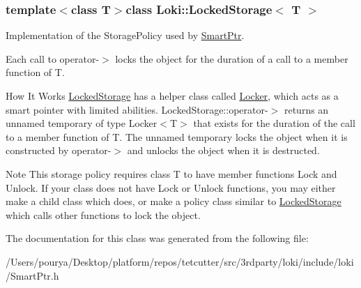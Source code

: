 \subsubsection*{template$<$class T$>$class Loki\+::\+Locked\+Storage$<$ T $>$}

Implementation of the Storage\+Policy used by \hyperlink{classLoki_1_1SmartPtr}{Smart\+Ptr}.

Each call to operator-\/$>$ locks the object for the duration of a call to a member function of T.

\begin{DoxyParagraph}{How It Works}
\hyperlink{classLoki_1_1LockedStorage}{Locked\+Storage} has a helper class called \hyperlink{classLoki_1_1Locker}{Locker}, which acts as a smart pointer with limited abilities. Locked\+Storage\+::operator-\/$>$ returns an unnamed temporary of type Locker$<$\+T$>$ that exists for the duration of the call to a member function of T. The unnamed temporary locks the object when it is constructed by operator-\/$>$ and unlocks the object when it is destructed.
\end{DoxyParagraph}
\begin{DoxyNote}{Note}
This storage policy requires class T to have member functions Lock and Unlock. If your class does not have Lock or Unlock functions, you may either make a child class which does, or make a policy class similar to \hyperlink{classLoki_1_1LockedStorage}{Locked\+Storage} which calls other functions to lock the object. 
\end{DoxyNote}


The documentation for this class was generated from the following file\+:\begin{DoxyCompactItemize}
\item 
/\+Users/pourya/\+Desktop/platform/repos/tetcutter/src/3rdparty/loki/include/loki/Smart\+Ptr.\+h\end{DoxyCompactItemize}
